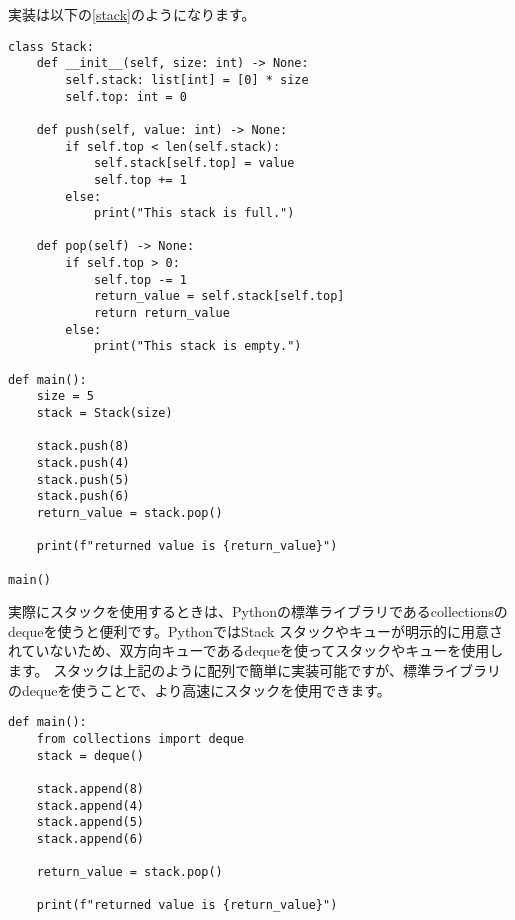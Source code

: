 \documentclass{jlreq}
\begin{document}
実装は以下の\ref{stack}のようになります。

\begin{lstlisting}[caption=スタックの実装, label=stack, frame=TRBL, label={stack}]
	class Stack:
    def __init__(self, size: int) -> None:
        self.stack: list[int] = [0] * size
        self.top: int = 0
    
    def push(self, value: int) -> None:
        if self.top < len(self.stack):
            self.stack[self.top] = value
            self.top += 1
        else:
            print("This stack is full.")
    
    def pop(self) -> None:
        if self.top > 0:
            self.top -= 1
            return_value = self.stack[self.top]
            return return_value
        else:
            print("This stack is empty.")

def main():
    size = 5
    stack = Stack(size)
    
    stack.push(8)
    stack.push(4)
    stack.push(5)
    stack.push(6)
    return_value = stack.pop()
    
    print(f"returned value is {return_value}")
    
main()

\end{lstlisting}

\begin{tcolorbox}[enhanced, title=Column1 collections.deque, breakable, colback=white, drop fuzzy shadow, attach boxed title to top center={yshift*=0.1cm}]
	実際にスタックを使用するときは、Pythonの標準ライブラリであるcollectionsのdequeを使うと便利です。PythonではStack スタックやキューが明示的に用意されていないため、双方向キューであるdequeを使ってスタックやキューを使用します。
	スタックは上記のように配列で簡単に実装可能ですが、標準ライブラリのdequeを使うことで、より高速にスタックを使用できます。

	\begin{lstlisting}[caption=スタックの実装, label=stack, frame=TRBL]
		def main():
    from collections import deque
    stack = deque()
    
    stack.append(8)
    stack.append(4)
    stack.append(5)
    stack.append(6)
    
    return_value = stack.pop()
    
    print(f"returned value is {return_value}")
	\end{lstlisting}
\end{tcolorbox}

\newpage
\end{document}
